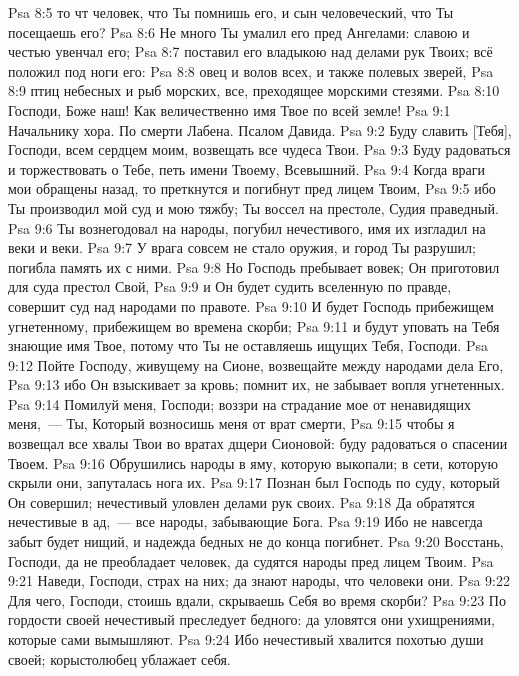 \vs Psa 8:5 то чт  человек, что Ты помнишь его, и сын человеческий, что Ты посещаешь его?
\vs Psa 8:6 Не много Ты умалил его пред Ангелами: славою и честью увенчал его;
\vs Psa 8:7 поставил его владыкою над делами рук Твоих; всё положил под ноги его:
\vs Psa 8:8 овец и волов всех, и также полевых зверей,
\vs Psa 8:9 птиц небесных и рыб морских, все, преходящее морскими стезями.
\vs Psa 8:10 Господи, Боже наш! Как величественно имя Твое по всей земле!
\vs Psa 9:1 Начальнику хора. По смерти Лабена. Псалом Давида.
\rsbpar\vs Psa 9:2 Буду славить [Тебя], Господи, всем сердцем моим, возвещать все чудеса Твои.
\vs Psa 9:3 Буду радоваться и торжествовать о Тебе, петь имени Твоему, Всевышний.
\vs Psa 9:4 Когда враги мои обращены назад, то преткнутся и погибнут пред лицем Твоим,
\vs Psa 9:5 ибо Ты производил мой суд и мою тяжбу; Ты воссел на престоле, Судия праведный.
\vs Psa 9:6 Ты вознегодовал на народы, погубил нечестивого, имя их изгладил на веки и веки.
\vs Psa 9:7 У врага совсем не стало оружия, и город Ты разрушил; погибла память их с ними.
\vs Psa 9:8 Но Господь пребывает вовек; Он приготовил для суда престол Свой,
\vs Psa 9:9 и Он будет судить вселенную по правде, совершит суд над народами по правоте.
\vs Psa 9:10 И будет Господь прибежищем угнетенному, прибежищем во времена скорби;
\vs Psa 9:11 и будут уповать на Тебя знающие имя Твое, потому что Ты не оставляешь ищущих Тебя, Господи.
\vs Psa 9:12 Пойте Господу, живущему на Сионе, возвещайте между народами дела Его,
\vs Psa 9:13 ибо Он взыскивает за кровь; помнит их, не забывает вопля угнетенных.
\vs Psa 9:14 Помилуй меня, Господи; воззри на страдание мое от ненавидящих меня,~--- Ты, Который возносишь меня от врат смерти,
\vs Psa 9:15 чтобы я возвещал все хвалы Твои во вратах дщери Сионовой: буду радоваться о спасении Твоем.
\vs Psa 9:16 Обрушились народы в яму, которую выкопали; в сети, которую скрыли они, запуталась нога их.
\vs Psa 9:17 Познан был Господь по суду, который Он совершил; нечестивый уловлен делами рук своих.
\vs Psa 9:18 Да обратятся нечестивые в ад,~--- все народы, забывающие Бога.
\vs Psa 9:19 Ибо не навсегда забыт будет нищий, и надежда бедных не до конца погибнет.
\vs Psa 9:20 Восстань, Господи, да не преобладает человек, да судятся народы пред лицем Твоим.
\vs Psa 9:21 Наведи, Господи, страх на них; да знают народы, что человеки они.
\vs Psa 9:22 Для чего, Господи, стоишь вдали, скрываешь Себя во время скорби?
\vs Psa 9:23 По гордости своей нечестивый преследует бедного: да уловятся они ухищрениями, которые сами вымышляют.
\vs Psa 9:24 Ибо нечестивый хвалится похотью души своей; корыстолюбец ублажает себя.
